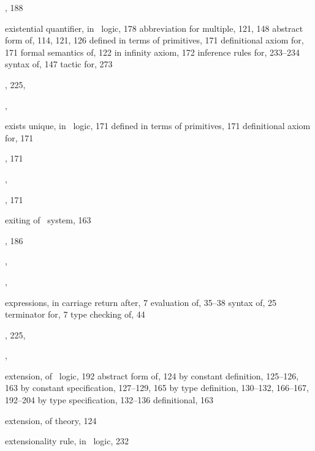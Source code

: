 \begin{theindex}
  \item {}, 188
  \item existential quantifier, in \HOL\ logic, 178
    \subitem abbreviation for multiple, 121, 148
    \subitem abstract form of, 114, 121, 126
    \subitem defined in terms of primitives, 171
    \subitem definitional axiom for, 171
    \subitem formal semantics of, 122
    \subitem in infinity axiom, 172
    \subitem inference rules for, 233--234
    \subitem syntax of, 147
    \subitem tactic for, 273
  \item {}, 225, 
  \item {}, 
  \item exists unique, in \HOL\ logic, 171
    \subitem defined in terms of primitives, 171
    \subitem definitional axiom for, 171
  \item {}, 171
  \item {}, 
  \item {}, 171
  \item exiting of \HOL\ system, 163
  \item {}, 186
  \item {}, 
  \item {}, 
  \item expressions, in \ML
    \subitem carriage return after, 7
    \subitem evaluation of, 35--38
    \subitem syntax of, 25
    \subitem terminator for, 7
    \subitem type checking of, 44
  \item {}, 225, 
  \item {}, 
  \item extension, of \HOL\ logic, 192
    \subitem abstract form of, 124
    \subitem by constant definition, 125--126, 163
    \subitem by constant specification, 127--129, 165
    \subitem by type definition, 130--132, 166--167, 192--204
    \subitem by type specification, 132--136
    \subitem definitional, 163
  \item extension, of theory, 124
  \item extensionality rule, in \HOL\ logic, 232

  \indexspace


\end{theindex}
